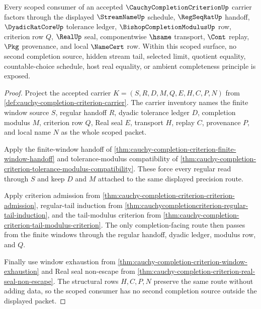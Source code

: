 \begin{theorem}
\label{thm:cauchy-completion-criterion-scoped-source-exhaustion}
Every scoped consumer of an accepted $\CauchyCompletionCriterionUp$ carrier factors through the displayed $\StreamNameUp$ schedule, $\RegSeqRatUp$ handoff, $\DyadicRatCoreUp$ tolerance ledger, $\BishopCompletionModulusUp$ row, criterion row $Q$, $\RealUp$ seal, componentwise $\hsame$ transport, $\Cont$ replay, $\Pkg$ provenance, and local $\NameCert$ row. Within this scoped surface, no second completion source, hidden stream tail, selected limit, quotient equality, countable-choice schedule, host real equality, or ambient completeness principle is exposed.
\end{theorem}
\begin{proof}
Project the accepted carrier $K=(S,R,D,M,Q,E,H,C,P,N)$ from \autoref{def:cauchy-completion-criterion-carrier}. The carrier inventory names the finite window source $S$, regular handoff $R$, dyadic tolerance ledger $D$, completion modulus $M$, criterion row $Q$, Real seal $E$, transport $H$, replay $C$, provenance $P$, and local name $N$ as the whole scoped packet.

Apply the finite-window handoff of \autoref{thm:cauchy-completion-criterion-finite-window-handoff} and tolerance-modulus compatibility of \autoref{thm:cauchy-completion-criterion-tolerance-modulus-compatibility}. These force every regular read through $S$ and keep $D$ and $M$ attached to the same displayed precision route.

Apply criterion admission from \autoref{thm:cauchy-completion-criterion-criterion-admission}, regular-tail induction from \autoref{thm:cauchycompletioncriterion-regular-tail-induction}, and the tail-modulus criterion from \autoref{thm:cauchy-completion-criterion-tail-modulus-criterion}. The only completion-facing route then passes from the finite windows through the regular handoff, dyadic ledger, modulus row, and $Q$.

Finally use window exhaustion from \autoref{thm:cauchy-completion-criterion-window-exhaustion} and Real seal non-escape from \autoref{thm:cauchy-completion-criterion-real-seal-non-escape}. The structural rows $H,C,P,N$ preserve the same route without adding data, so the scoped consumer has no second completion source outside the displayed packet.
\end{proof}

